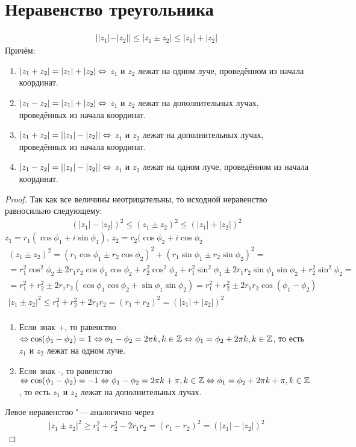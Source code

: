 \section{Неравенство треугольника}

\begin{theorem}{} 
\begin{gather*}
||z_1| - |z_2|| \leqslant |z_1 \pm z_2| \leqslant |z_1| + |z_2|
\end{gather*}
Причём:
\begin{enumerate}
	\item $|z_1 + z_2| = |z_1| + |z_2| \Leftrightarrow$ $z_1$ и $z_2$ лежат на одном луче, проведённом из начала координат.
	\item $|z_1 - z_2| = |z_1| + |z_2| \Leftrightarrow$ $z_1$ и $z_2$ лежат на дополнительных лучах, проведённых из начала координат.
	\item $|z_1 + z_2| = ||z_1| - |z_2|| \Leftrightarrow$ $z_1$ и $z_2$ лежат на дополнительных лучах, проведённых из начала координат.
	\item $|z_1 - z_2| = ||z_1| - |z_2|| \Leftrightarrow$ $z_1$ и $z_2$ лежат на одном луче, проведённом из начала координат.
\end{enumerate} 
\end{theorem}
\begin{proof}
Так как все величины неотрицательны, то исходной неравенство равносильно следующему:
\begin{gather*}
(|z_1|-|z_2|)^2 \leqslant (z_1 \pm z_2)^2 \leqslant (|z_1| + |z_2|)^2
\end{gather*}
$z_1 = r_1(\cos \phi_1 + i \sin \phi_1)$, $z_2 = r_2(\cos \phi_2 + i \cos \phi_2$
\begin{gather*}
(z_1 \pm z_2)^2 = (r_1 \cos \phi_1 \pm r_2 \cos \phi_2)^2 + (r_1 \sin \phi_1 \pm r_2 \sin \phi_2)^2 = \\
= r_1^2 \cos^2 \phi_2 \pm 2r_1r_2 \cos \phi_1 \cos \phi_2 + r_2^2 \cos^2 \phi_2 + r_1^2 \sin^2 \phi_1 \pm 2r_1r_2 \sin \phi_1 \sin \phi_2 + r_2^2 \sin^2 \phi_2 = \\
= r_1^2 + r_2 ^2 \pm 2r_1r_2(\cos \phi_1 \cos \phi_2 + \sin \phi_1 \sin \phi_2) = r_1^2 + r_2^2 \pm 2r_1r_2 \cos(\phi_1 - \phi_2) \\
|z_1 \pm z_2|^2 \leqslant r_1^2 + r_2^2 + 2r_1r_2 = (r_1 + r_2)^2 = (|z_1| + |z_2|)^2 \\
\end{gather*}
\begin{enumerate}
	\item Если знак +, то равенство $\Leftrightarrow \cos(\phi_1 - \phi_2) = 1 \Leftrightarrow \phi_1 - \phi_2 = 2 \pi k, k \in \mathbb{Z} \Leftrightarrow \phi_1 = \phi_2 + 2 \pi k, k \in \mathbb{Z}$, то есть $z_1$ и $z_2$ лежат на одном луче.
	\item Если знак -, то равенство $\Leftrightarrow \cos(\phi_1 - \phi_2) = -1 \Leftrightarrow \phi_1 - \phi_2 = 2 \pi k + \pi, k \in \mathbb{Z} \Leftrightarrow \phi_1 = \phi_2 + 2 \pi k + \pi, k \in \mathbb{Z}$, то есть $z_1$ и $z_2$ лежат на дополнительных лучах.
\end{enumerate}
Левое неравенство "--- аналогично через
\begin{gather*}
|z_1 \pm z_2|^2 \geqslant r_1^2 + r_2^2 - 2r_1r_2 = (r_1 - r_2)^2 = (|z_1| - |z_2|)^2
\end{gather*}
\end{proof}